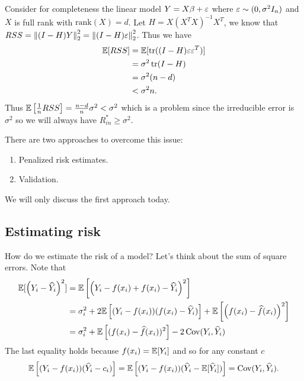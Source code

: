 \begin{ex}
    Consider for completeness the linear model $Y=X\beta + \varepsilon$ where $\varepsilon \sim (0, \sigma^2I_n)$ and $X$ is full rank with $\text{rank}(X) = d$. Let $H=X(X^TX)^{-1}X^T$, we know that $RSS = \left\|(I-H)Y\right\|_2^2 = \left\|(I-H)\varepsilon\right\|_2^2$. Thus we have 
    \begin{align*}
        {\mathbb{E}}[RSS] &= {\mathbb{E}}[\operatorname*{tr}((I-H)\varepsilon\varepsilon^T)]\\
        &=\sigma^2\operatorname*{tr}(I-H)\\
        &=\sigma^2(n-d)\\
        &< \sigma^2 n.
    \end{align*}
    Thus ${\mathbb{E}}\left[\frac{1}{n}RSS\right] = \frac{n-d}{n}\sigma^2 < \sigma^2$ which is a problem since the irreducible error is $\sigma^2$ so we will always have $R_{in}^* \ge \sigma^2$.
\end{ex}
There are two approaches to overcome this issue:
\begin{enumerate}
    \item Penalized risk estimates.
    \item Validation.
\end{enumerate}
We will only discuss the first approach today.

\subsection{Estimating risk}
How do we estimate the risk of a model? Let's think about the sum of square errors. Note that
\begin{align*}
    {\mathbb{E}}[\left(Y_i-\widehat{Y}_i\right)^2]&={\mathbb{E}}\left[\left(Y_i-f(x_i)+f(x_i)-\widehat{Y}_i\right)^2\right]\\
    &=\sigma_i^2+2{\mathbb{E}}\left[(Y_i-f(x_i))(f(x_i)-\widehat{Y}_i)\right]+{\mathbb{E}}\left[\left(f(x_i)-\widehat{f}(x_i)\right)^2\right]\\
    &=\sigma_i^2+{\mathbb{E}}\left[(f(x_i)-\widehat{f}(x_i))^2\right]-2\operatorname*{Cov}(Y_i,\widehat{Y}_i)
\end{align*}
The last equality holds because $f(x_i) = {\mathbb{E}}[Y_i]$ and so for any constant $c$
\[{\mathbb{E}}\left[(Y_i-f(x_i))(\widehat{Y}_i-c_i)\right] = {\mathbb{E}}\left[(Y_i-f(x_i))(\widehat{Y}_i-{\mathbb{E}}[\widehat{Y}_i])\right] =\operatorname*{Cov}(Y_i,\widehat{Y}_i).\]
